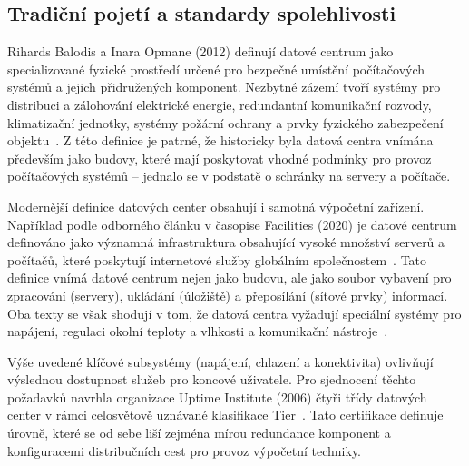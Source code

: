 \subsection{Tradiční pojetí a standardy spolehlivosti}
\label{subsec:tradice}

Rihards Balodis a Inara Opmane (2012) definují datové centrum jako specializované fyzické prostředí určené pro bezpečné umístění počítačových systémů a jejich přidružených komponent. Nezbytné zázemí tvoří systémy pro distribuci a zálohování elektrické energie, redundantní komunikační rozvody, klimatizační jednotky, systémy požární ochrany a prvky fyzického zabezpečení objektu~\cite[s.~180--181]{tatnall_reflections_2012}. Z této definice je patrné, že historicky byla datová centra vnímána především jako budovy, které mají poskytovat vhodné podmínky pro provoz počítačových systémů -- jednalo se v podstatě o schránky na servery a počítače.

Modernější definice datových center obsahují i samotná výpočetní zařízení. Například podle odborného článku v časopise Facilities (2020) je datové centrum definováno jako významná infrastruktura obsahující vysoké množství serverů a počítačů, které poskytují internetové služby globálním společnostem~\cite{fadaeefath_abadi_data_2020}. Tato definice vnímá datové centrum nejen jako budovu, ale jako soubor vybavení pro zpracování (servery), ukládání (úložiště) a přeposílání (síťové prvky) informací. Oba texty se však shodují v tom, že datová centra vyžadují speciální systémy pro napájení, regulaci okolní teploty a vlhkosti a komunikační nástroje~\cite{tatnall_reflections_2012, fadaeefath_abadi_data_2020}.

Výše uvedené klíčové subsystémy (napájení, chlazení a konektivita) ovlivňují výslednou dostupnost služeb pro koncové uživatele. Pro sjednocení těchto požadavků navrhla organizace Uptime Institute (2006) čtyři třídy datových center v rámci celosvětově uznávané klasifikace Tier~\cite{turner_iv_tier_2006}. Tato certifikace definuje úrovně, které se od sebe liší zejména mírou redundance komponent a konfiguracemi distribučních cest pro provoz výpočetní techniky.

